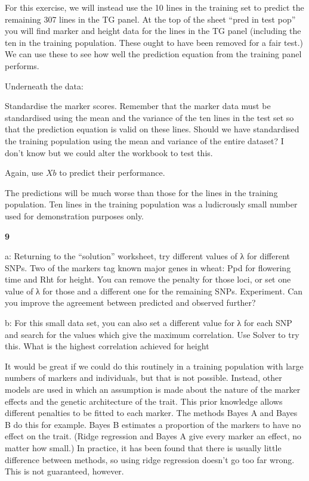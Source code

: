 \documentclass[
]{book}
\makeatletter
\newenvironment{kframe}{%
\medskip{}
\setlength{\fboxsep}{.8em}
 \def\at@end@of@kframe{}%
 \ifinner\ifhmode%
  \def\at@end@of@kframe{\end{minipage}}%
  \begin{minipage}{\columnwidth}%
 \fi\fi%
 \def\FrameCommand##1{\hskip\@totalleftmargin \hskip-\fboxsep
 \colorbox{shadecolor}{##1}\hskip-\fboxsep
     \hskip-\linewidth \hskip-\@totalleftmargin \hskip\columnwidth}%
 \MakeFramed {\advance\hsize-\width
   \@totalleftmargin\z@ \linewidth\hsize
   \@setminipage}}%
 {\par\unskip\endMakeFramed%
 \at@end@of@kframe}
\newenvironment{rmdblock}[1]
  {
  \begin{itemize}
  \renewcommand{\labelitemi}{
    \raisebox{-.7\height}[0pt][0pt]{
      {\setkeys{Gin}{width=3em,keepaspectratio}\texttt{[image: images/\#1]}}
    }
  }
  \setlength{\fboxsep}{1em}
  \begin{kframe}
  \item
  }
  {
  \end{kframe}
  \end{itemize}
  }
\newenvironment{rmdquiz}
  {\begin{rmdblock}{quiz}}
  {\end{rmdblock}}
\makeatother
\begin{document}
For this exercise, we will instead use the 10 lines in the training set to predict the remaining 307 lines in the TG panel. At the top of the sheet ``pred in test pop'' you will find marker and height data for the lines in the TG panel (including the ten in the training population. These ought to have been removed for a fair test.) We can use these to see how well the prediction equation from the training panel performs.

Underneath the data:

Standardise the marker scores. Remember that the marker data must be standardised using the mean and the variance of the ten lines in the test set so that the prediction equation is valid on these lines. Should we have standardised the training population using the mean and variance of the entire dataset? I don't know but we could alter the workbook to test this.

Again, use \(Xb\) to predict their performance.

The predictions will be much worse than those for the lines in the training population. Ten lines in the training population was a ludicrously small number used for demonstration purposes only.

\begin{rmdquiz}
\textbf{9}

a: Returning to the ``solution'' worksheet, try different values of λ for different SNPs. Two of the markers tag known major genes in wheat: Ppd for flowering time and Rht for height. You can remove the penalty for those loci, or set one value of λ for those and a different one for the remaining SNPs. Experiment. Can you improve the agreement between predicted and observed further?

b: For this small data set, you can also set a different value for λ for each SNP and search for the values which give the maximum correlation. Use Solver to try this. What is the highest correlation achieved for height
\end{rmdquiz}

It would be great if we could do this routinely in a training population with large numbers of markers and individuals, but that is not possible. Instead, other models are used in which an assumption is made about the nature of the marker effects and the genetic architecture of the trait. This prior knowledge allows different penalties to be fitted to each marker. The methods Bayes A and Bayes B do this for example. Bayes B estimates a proportion of the markers to have no effect on the trait. (Ridge regression and Bayes A give every marker an effect, no matter how small.) In practice, it has been found that there is usually little difference between methods, so using ridge regression doesn't go too far wrong. This is not guaranteed, however.
\end{document}
